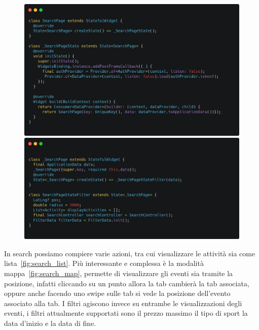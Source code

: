 \documentclass[a4paper,12pt]{article}
\begin{document}
\begin{figure}[H]
    \begin{minipage}{0.49\textwidth}
        \centering
        \includegraphics[width=1\linewidth]{img/search_page.png}
    \end{minipage}\hfill
    \begin{minipage}{0.49\textwidth}
        \centering
        \includegraphics[width=1\linewidth]{img/search_state.png}
    \end{minipage}
\end{figure}

In search possiamo compiere varie azioni, tra cui visualizzare le attività sia come lista~\ref{fig:search_list}. Più interessante e complessa è la modalità mappa~\ref{fig:search_map}, permette di visualizzare gli eventi sia tramite la posizione, infatti cliccando su un punto allora la tab cambierà la tab associata, oppure anche facendo uno swipe sulle tab si vede la posizione dell'evento associato alla tab.
I filtri agiscono invece su entrambe le visualizzazioni degli eventi, i filtri attualmente supportati sono il prezzo massimo il tipo di sport la data d'inizio e la data di fine.
\end{document}
